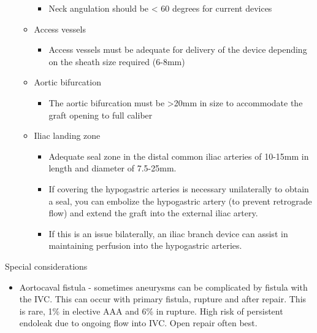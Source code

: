 \documentclass[
]{book}
\providecommand{\tightlist}{%
  \setlength{\itemsep}{0pt}\setlength{\parskip}{0pt}}
\begin{document}
\begin{itemize}
\begin{itemize}
    \begin{itemize}
    \tightlist
    \item
      Neck angulation should be \textless{} 60 degrees for current devices
    \end{itemize}
  \item
    Access vessels

    \begin{itemize}
    \tightlist
    \item
      Access vessels must be adequate for delivery of the device
      depending on the sheath size required (6-8mm)
    \end{itemize}
  \item
    Aortic bifurcation

    \begin{itemize}
    \tightlist
    \item
      The aortic bifurcation must be \textgreater20mm in size to accommodate
      the graft opening to full caliber
    \end{itemize}
  \item
    Iliac landing zone

    \begin{itemize}
    \item
      Adequate seal zone in the distal common iliac arteries of
      10-15mm in length and diameter of 7.5-25mm.
    \item
      If covering the hypogastric arteries is necessary
      unilaterally to obtain a seal, you can embolize the
      hypogastric artery (to prevent retrograde flow) and extend
      the graft into the external iliac artery.
    \item
      If this is an issue bilaterally, an iliac branch device can
      assist in maintaining perfusion into the hypogastric
      arteries.
    \end{itemize}
  \end{itemize}
\end{itemize}

Special considerations

\begin{itemize}
\tightlist
\item
  Aortocaval fistula - sometimes aneurysms can be complicated by
  fistula with the IVC. This can occur with primary fistula, rupture
  and after repair. This is rare, 1\% in elective AAA and 6\% in
  rupture.\citep{brightwell2013, schmidt1994} High risk of persistent
  endoleak due to ongoing flow into IVC. Open repair often
  best.\citep{orion2016}
\end{itemize}
\end{document}
